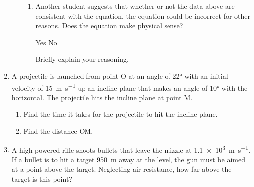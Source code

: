 \documentclass{../../../oss-apphys}
\begin{document}
\begin{enumerate}[leftmargin=15pt]
\begin{enumerate}[nosep]
\begin{enumerate}[nosep]
    \item Another student suggests that whether or not the data above are
      consistent with the equation, the equation could be incorrect for other
      reasons. Does the equation make physical sense?

      \vspace{.1in}
      \underline{\hspace{.25in}} Yes\hspace{.5in}
      \underline{\hspace{.25in}} No
    
      \vspace{.1in}Briefly explain your reasoning.\vspace{1in}
    \end{enumerate}
  \end{enumerate}
  \newpage
  
\item A projectile is launched from point O at an angle of \ang{22} with an
  initial velocity of \SI{15}{\metre\per\second} up an incline plane that makes
  an angle of \ang{10} with the horizontal. The projectile hits the incline
  plane at point M.
  \begin{enumerate}[nosep]
  \item Find the time it takes for the projectile to hit the incline plane.
  \item Find the distance OM.
  \end{enumerate}
  

\item A high-powered rifle shoots bullets that leave the mizzle at
  \SI{1.1e3}{\metre\per\second}. If a bullet is to hit a target
  \SI{950}{\metre} away at the level, the gun must be aimed at a point above
  the target. Neglecting air resistance, how far above the target is this
  point?


\end{enumerate}
\end{document}
